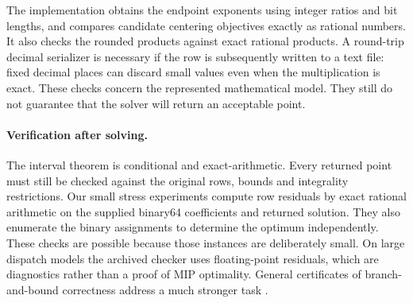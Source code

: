 The implementation obtains the endpoint exponents using integer ratios and
bit lengths, and compares candidate centering objectives exactly as rational numbers. It also
checks the rounded products against exact rational products.
A round-trip decimal serializer is necessary if the row is subsequently written
to a text file: fixed decimal places can discard small values even when the
multiplication is exact. These checks concern the represented mathematical model.
They still do not guarantee that the solver will return an acceptable point.

\paragraph{Verification after solving.}
The interval theorem is conditional and exact-arithmetic. Every returned point must
still be checked against the original rows, bounds and integrality restrictions.
Our small stress experiments compute row residuals by exact rational arithmetic on
the supplied binary64 coefficients and returned solution. They also enumerate the
binary assignments to determine the optimum independently. These checks are possible
because those instances are deliberately small. On large dispatch models the archived
checker uses floating-point residuals, which are diagnostics rather than a proof of
MIP optimality. General certificates of branch-and-bound correctness address a much
stronger task \cite{cheung2017certificates}.
